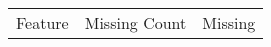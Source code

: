 \begin{tabular}{lrr}
\toprule
Feature & Missing Count & Missing %
\midrule
\bottomrule
\end{tabular}
